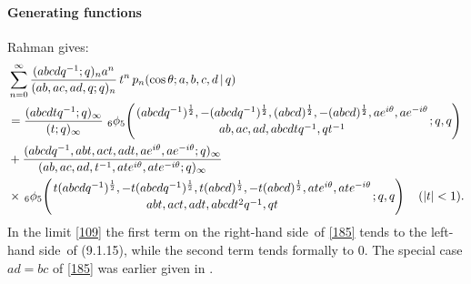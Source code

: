 \documentclass[twoside,11pt]{article}
\newcommand\tha\theta
\newcommand\half{\frac12}
\newcommand\iy\infty
\newcommand{\qhyp}[5]{\,\mbox{}_{#1}\phi_{#2}\!\left(
  \genfrac{}{}{0pt}{}{#3}{#4};#5\right)}
\newcommand\LHS{left-hand side}
\newcommand\RHS{right-hand side}
\begin{document}
\paragraph{Generating functions}
Rahman  gives:
\begin{align}
&\sum_{n=0}^\iy \frac{(abcdq^{-1};q)_n a^n}{(ab,ac,ad,q;q)_n}\,t^n\,
p_n(\cos\tha;a,b,c,d\,|\,q)
\nonumber\\
&=\frac{(abcdtq^{-1};q)_\iy}{(t;q)_\iy}\,
\qhyp65{(abcdq^{-1})^\half,-(abcdq^{-1})^\half,(abcd)^\half,
-(abcd)^\half,a e^{i\tha},a e^{-i\tha}}
{ab,ac,ad,abcdtq^{-1},qt^{-1}}{q,q}
\nonumber\\
&+\frac{(abcdq^{-1},abt,act,adt,ae^{i\tha},ae^{-i\tha};q)_\iy}
{(ab,ac,ad,t^{-1},ate^{i\tha},ate^{-i\tha};q)_\iy}
\nonumber\\
&\times\qhyp65{t(abcdq^{-1})^\half,-t(abcdq^{-1})^\half,t(abcd)^\half,
-t(abcd)^\half,at e^{i\tha},at e^{-i\tha}}
{abt,act,adt,abcdt^2q^{-1},qt}{q,q}\quad(|t|<1).
\label{185}
\end{align}
In the limit \eqref{109} the first term on the \RHS\ of \eqref{185}
tends to the \LHS\ of (9.1.15), while the second term tends formally
to 0. The special case $ad=bc$ of \eqref{185} was earlier given in
.
%
\end{document}
